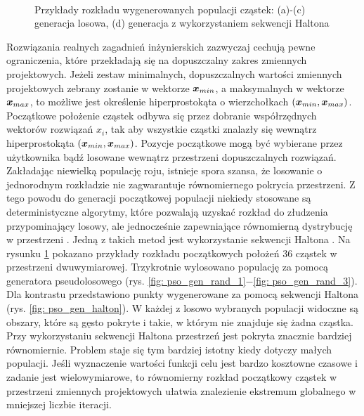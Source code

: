 \begin{figure}[hbt!]
	\centering
	\\
	\captionsetup{justification=centering}
	\caption{Przykłady rozkładu wygenerowanych populacji cząstek: (a)-(c) generacja losowa, (d) generacja z wykorzystaniem sekwencji Haltona}
	\label{fig: pso_gen_expl}
\end{figure}

Rozwiązania realnych zagadnień inżynierskich zazwyczaj cechują pewne ograniczenia, które przekładają się na dopuszczalny zakres zmiennych projektowych. Jeżeli zestaw minimalnych, dopuszczalnych wartości zmiennych projektowych zebrany zostanie w wektorze $\bm{x}_{min}$, a maksymalnych w wektorze $\bm{x}_{max}$, to możliwe jest określenie hiperprostokąta o wierzchołkach $(\bm{x}_{min},\bm{x}_{max})$. Początkowe położenie cząstek odbywa się przez dobranie współrzędnych wektorów rozwiązań $x_i$, tak aby wszystkie cząstki znalazły się wewnątrz hiperprostokąta $(\bm{x}_{min},\bm{x}_{max})$. Pozycje początkowe mogą być wybierane przez użytkownika bądź losowane wewnątrz przestrzeni dopuszczalnych rozwiązań. Zakładając niewielką populację roju, istnieje spora szansa, że losowanie o jednorodnym rozkładzie nie zagwarantuje równomiernego pokrycia przestrzeni. Z tego powodu do generacji początkowej populacji niekiedy stosowane są deterministyczne algorytmy, które pozwalają uzyskać rozkład do złudzenia przypominający losowy, ale jednocześnie zapewniające równomierną dystrybucję w przestrzeni \parencite{Saliby2002}. Jedną z takich metod jest wykorzystanie sekwencji Haltona \parencite{Tesch2016}. Na rysunku \ref{fig: pso_gen_expl} pokazano przykłady rozkładu początkowych położeń 36 cząstek w przestrzeni dwuwymiarowej. Trzykrotnie wylosowano populację za pomocą generatora pseudolosowego (rys. \ref{fig: pso_gen_rand_1}$-$\ref{fig: pso_gen_rand_3}). Dla kontrastu przedstawiono punkty wygenerowane za pomocą sekwencji Haltona (rys. \ref{fig: pso_gen_halton}). W każdej z losowo wybranych populacji widoczne są obszary, które są gęsto pokryte i takie, w którym nie znajduje się żadna cząstka. Przy wykorzystaniu sekwencji Haltona przestrzeń jest pokryta znacznie bardziej równomiernie. Problem staje się tym bardziej istotny kiedy dotyczy małych populacji. Jeśli wyznaczenie wartości funkcji celu jest bardzo kosztowne czasowe i zadanie jest wielowymiarowe, to równomierny rozkład początkowy cząstek w przestrzeni zmiennych projektowych ułatwia znalezienie ekstremum globalnego w mniejszej liczbie iteracji.

